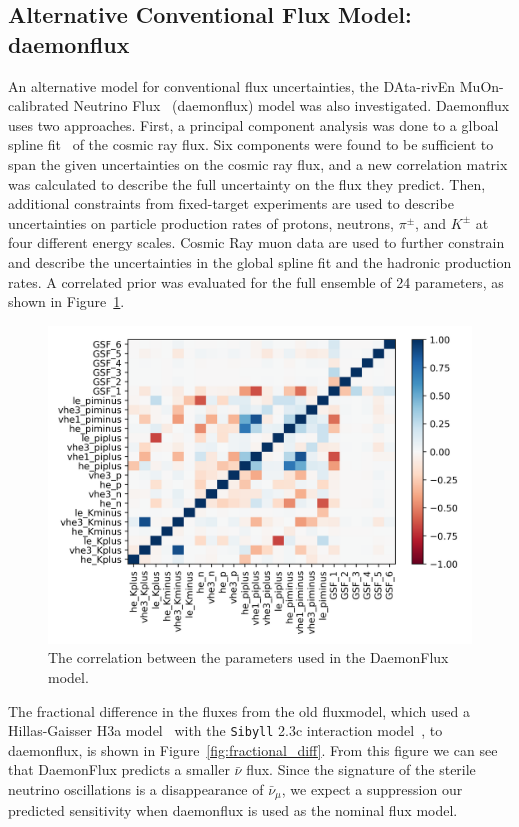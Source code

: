 \documentclass[main.tex]{subfiles}
\begin{document}
\subsection{Alternative Conventional Flux Model: daemonflux}\label{sec:daemon_sense}
An alternative model for conventional flux uncertainties, the DAta-rivEn MuOn-calibrated Neutrino Flux~\cite{yanez2023daemonflux} (daemonflux) model was also investigated. 
Daemonflux uses two approaches. 
First, a principal component analysis was done to a glboal spline fit~\cite{dembinski2017datadriven} of the cosmic ray flux. 
Six components were found to be sufficient to span the given uncertainties on the cosmic ray flux, and a new correlation matrix was calculated to describe the full uncertainty on the flux they predict. 
Then, additional constraints from fixed-target experiments are used to describe uncertainties on particle production rates of protons, neutrons, $\pi^{\pm}$, and $K^{\pm}$ at four different energy scales. 
Cosmic Ray muon data are used to further constrain and describe the uncertainties in the global spline fit and the hadronic production rates. 
A correlated prior was evaluated for the full ensemble of 24 parameters, as shown in Figure~\ref{fig:daemon_cor}.
\begin{figure}
    \centering
    \includegraphics[width=0.7\linewidth]{figures/daemon_cov.png}
    \caption{The correlation between the parameters used in the DaemonFlux model.}\label{fig:daemon_cor}
\end{figure}


The fractional difference in the fluxes from the old fluxmodel, which used a Hillas-Gaisser H3a model~\cite{GAISSER2012801} with the \texttt{Sibyll} 2.3c interaction model~\cite{Riehn:2017mfm}, to daemonflux, is shown in Figure~\ref{fig:fractional_diff}. 
From this figure we can see that DaemonFlux predicts a smaller $\bar{\nu}$ flux. 
Since the signature of the sterile neutrino oscillations is a disappearance of $\bar{\nu}_{\mu}$, we expect a suppression our predicted sensitivity when daemonflux is used as the nominal flux model.
\end{document}
